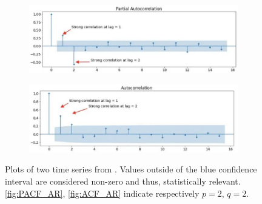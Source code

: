 \begin{figure}
    \begin{subfigure}[t]{0.5\textwidth}
        \includegraphics[width=1\textwidth]{images/PACF_AR(2).jpg}
        \label{fig:PACF_AR}
    \end{subfigure}
    \begin{subfigure}[t]{0.5\textwidth}
        \includegraphics[width=1\textwidth]{images/ACF_MA(2).jpg}
        \label{fig:ACF_AR}
    \end{subfigure}
    \caption{Plots of two time series from \cite{P_ACF}. Values outside of the blue confidence interval are considered non-zero and thus, statistically relevant. \autoref{fig:PACF_AR}, \autoref{fig:ACF_AR} indicate respectively $p=2$, $q=2$.}
\end{figure}

